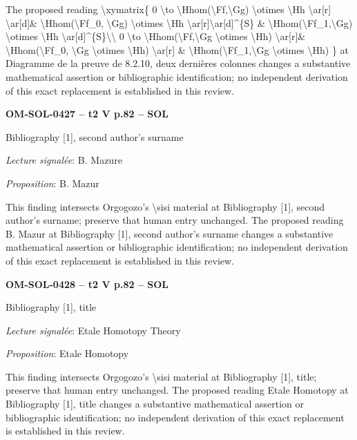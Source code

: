 The proposed reading \textbackslash{}xymatrix\{ 0 \textbackslash{}to \textbackslash{}Hhom(\textbackslash{}Ff,\textbackslash{}Gg) \textbackslash{}otimes \textbackslash{}Hh \textbackslash{}ar[r] \textbackslash{}ar[d]\& \textbackslash{}Hhom(\textbackslash{}Ff\_0, \textbackslash{}Gg) \textbackslash{}otimes \textbackslash{}Hh \textbackslash{}ar[r]\textbackslash{}ar[d]\textasciicircum{}\{S\} \& \textbackslash{}Hhom(\textbackslash{}Ff\_1,\textbackslash{}Gg) \textbackslash{}otimes \textbackslash{}Hh \textbackslash{}ar[d]\textasciicircum{}\{S\}\textbackslash{}\textbackslash{} 0 \textbackslash{}to \textbackslash{}Hhom(\textbackslash{}Ff,\textbackslash{}Gg \textbackslash{}otimes \textbackslash{}Hh) \textbackslash{}ar[r]\& \textbackslash{}Hhom(\textbackslash{}Ff\_0, \textbackslash{}Gg \textbackslash{}otimes \textbackslash{}Hh) \textbackslash{}ar[r] \& \textbackslash{}Hhom(\textbackslash{}Ff\_1,\textbackslash{}Gg \textbackslash{}otimes \textbackslash{}Hh) \} at Diagramme de la preuve de 8.2.10, deux dernières colonnes changes a substantive mathematical assertion or bibliographic identification; no independent derivation of this exact replacement is established in this review.\par
\par\noindent\textbf{OM-SOL-0427 -- t2 V p.82 -- SOL}\par
Bibliography [1], second author's surname\par
\emph{Lecture signalée}: B. Mazure\par
\emph{Proposition}: B. Mazur\par
This finding intersects Orgogozo's \textbackslash{}sisi material at Bibliography [1], second author's surname; preserve that human entry unchanged. The proposed reading B. Mazur at Bibliography [1], second author's surname changes a substantive mathematical assertion or bibliographic identification; no independent derivation of this exact replacement is established in this review.\par
\par\noindent\textbf{OM-SOL-0428 -- t2 V p.82 -- SOL}\par
Bibliography [1], title\par
\emph{Lecture signalée}: Etale Homotopy Theory\par
\emph{Proposition}: Etale Homotopy\par
This finding intersects Orgogozo's \textbackslash{}sisi material at Bibliography [1], title; preserve that human entry unchanged. The proposed reading Etale Homotopy at Bibliography [1], title changes a substantive mathematical assertion or bibliographic identification; no independent derivation of this exact replacement is established in this review.\par
